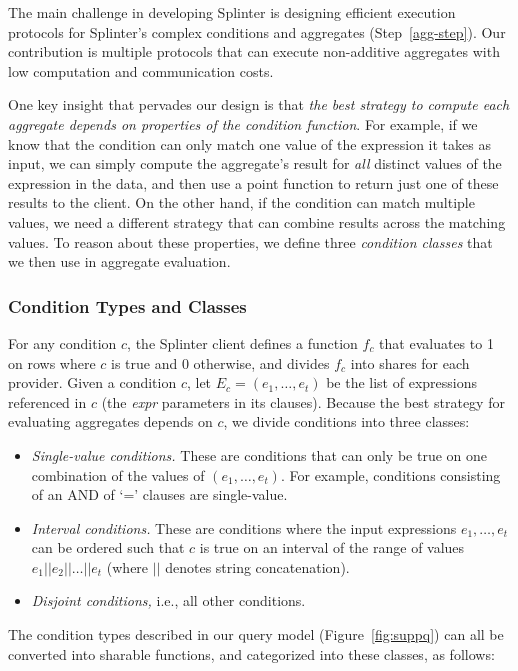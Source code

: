 The main challenge in developing Splinter is designing efficient execution protocols
for Splinter's complex conditions and aggregates (Step~\ref{agg-step}).
Our contribution is multiple protocols that can execute non-additive
aggregates with low computation and communication costs.

One key insight that pervades our design is that \emph{the best strategy to
	compute each aggregate depends on properties of the condition function}.
For example, if we know that the condition can only match one value of
the expression it takes as input, we can simply compute the aggregate's result
for \emph{all} distinct values of the expression in the data, and then use a point
function to return just one of these results to the client.
On the other hand, if the condition can match multiple values, we need a
different strategy that can combine results across the matching values.
To reason about these properties, we define three \emph{condition classes}
that we then use in aggregate evaluation.

\subsubsection{Condition Types and Classes}
\label{sec:complex-conditions}

For any condition $c$, the Splinter client defines a function $f_c$
that evaluates to 1 on rows where $c$ is true and 0 otherwise, and divides
$f_c$ into shares for each provider.
Given a condition $c$, let $E_c = (e_1, \dots, e_t)$ be the list of
expressions referenced in $c$ (the \emph{expr} parameters in its clauses).
Because the best strategy for evaluating aggregates depends on $c$, we
divide conditions into three classes:
\begin{itemize}
	\item \emph{Single-value conditions.} These are conditions that can only be
	true on one combination of the values of $(e_1, \dots, e_t)$.
	For example, conditions consisting of an AND of `='
	clauses are single-value.
	\item \emph{Interval conditions.} These are conditions where the input
	expressions $e_1,\dots,e_t$ can be ordered such that $c$ is true on an
	interval of the range of values $e_1||e_2||\dots||e_t$ (where $||$ denotes
	string concatenation).
	\item \emph{Disjoint conditions,} i.e., all other conditions.
\end{itemize}

The condition types described in our query model (Figure~\ref{fig:suppq})
can all be converted into sharable functions, and categorized into these classes,
as follows:

